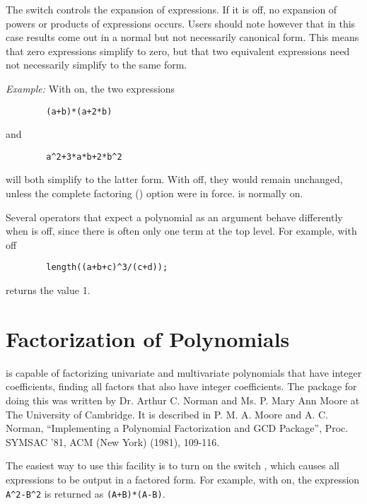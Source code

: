 The switch  controls the expansion of expressions.  If
it is off, no expansion of powers or products of expressions occurs.
Users should note however that in this case results come out in a normal
but not necessarily canonical form.  This means that zero expressions
simplify to zero, but that two equivalent expressions need not necessarily
simplify to the same form.

\textit{Example:} With  on, the two expressions
\begin{verbatim}
        (a+b)*(a+2*b)
\end{verbatim}
and
\begin{verbatim}
        a^2+3*a*b+2*b^2
\end{verbatim}
will both simplify to the latter form.  With 
off, they would remain unchanged, unless the complete factoring 
() option were in force.  is normally on.

Several operators that expect a polynomial as an argument behave
differently when  is off, since there is often only one term at
the top level.  For example, with  off
\begin{verbatim}
        length((a+b+c)^3/(c+d));
\end{verbatim}
returns the value 1.

\section{Factorization of Polynomials}
\hypertarget{switch:FACTOR}{}
\hypertarget{switch:IFACTOR}{}

{\REDUCE} is capable of factorizing univariate and multivariate polynomials
that have integer coefficients, finding all factors that also have integer
coefficients. The package for doing this was written by Dr. Arthur C.
Norman and Ms. P. Mary Ann Moore at The University of Cambridge. It is
described in P. M. A. Moore and A. C. Norman, ``Implementing a Polynomial
Factorization and GCD Package'', Proc. SYMSAC '81, ACM (New York) (1981),
109-116.

The easiest way to use this facility is to turn on the switch
, which causes all expressions to be output in
a factored form.  For example, with  on, the expression
\texttt{A\textasciicircum2-B\textasciicircum2} is returned as 
\texttt{(A+B)*(A-B)}.

